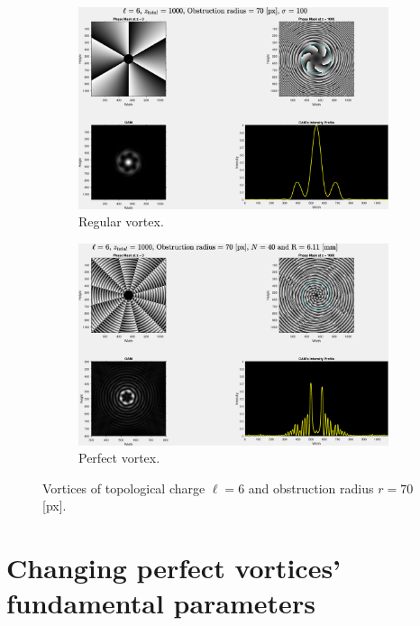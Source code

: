 \begin{figure}[htbp]
    \centering
    \begin{subfigure}[b]{0.45\textwidth}
        \centering
        \includegraphics[width=\textwidth]{images/Appendices/Additional_Results/Topological_Charge/type=0_r=70_zi=0_zf=1000.eps}
        \caption{Regular vortex.}
    \end{subfigure}
    \hfill
    \begin{subfigure}[b]{0.45\textwidth}
        \centering
        \includegraphics[width=\textwidth]{images/Appendices/Additional_Results/Topological_Charge/type=1_r=70_zi=0_zf=1000.eps}
        \caption{Perfect vortex.}
    \end{subfigure}
    \caption{Vortices of topological charge $\ell = 6$ and obstruction radius $r = 70$ [px].}
    \label{fig:L=6_r=70}
\end{figure}


\newpage
\section{Changing perfect vortices' fundamental parameters}
